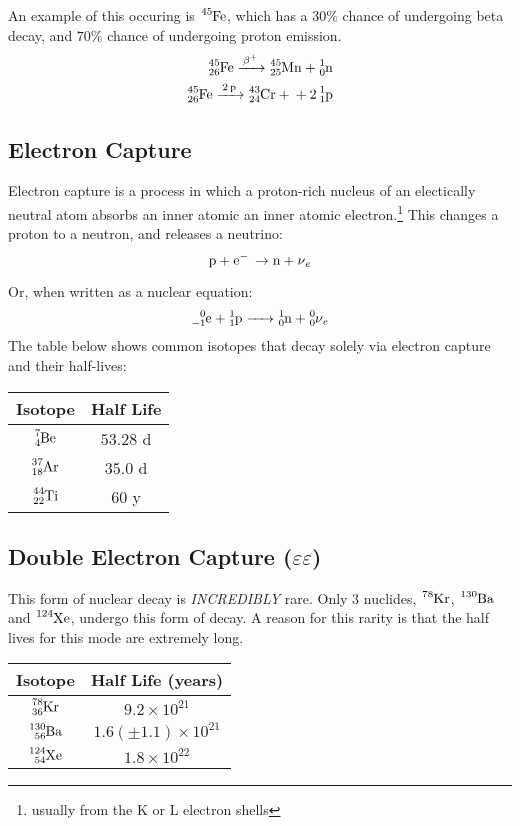 \documentclass{article}
\begin{document}
\begin{multicols*}{2}
    An example of this occuring is $\ce{^{45}Fe}$, which has a $30\%$ chance
    of undergoing beta decay, and $70\%$ chance of undergoing proton emission.
    \begin{equation*}
      \begin{split}
        \ce{^{45}_{26}Fe ->[\beta^{+}] ^{45}_{25}Mn + ^{1}_{0}n} \\
        \ce{^{45}_{26}Fe ->[2p] ^{43}_{24}Cr + + 2 ^{1}_{1}p}
      \end{split}
    \end{equation*}

    \subsection{Electron Capture}
    Electron capture is a process in which a proton-rich nucleus of an electically
    neutral atom absorbs an inner atomic an inner atomic electron.\footnote{usually from the K or L electron shells}
    This changes a proton to a neutron, and releases a neutrino:
    \[
      \ce{p + e- \to n + \nu_e}
    \]

    Or, when written as a nuclear equation:
    \[
      \ce{^{0}_{-1}e + ^{1}_{1}p -> ^{1}_{0}n + ^{0}_{0}\nu_{e}}
    \]
    The table below shows common isotopes that decay solely via electron capture
    and their half-lives: \\

    \begin{tabular}{|c|c|}
      \hline
      \textbf{Isotope} & \textbf{Half Life} \\
      \hline
      $\ce{^{7}_{4}Be}$ & $53.28$ d \\
      $\ce{^{37}_{18}Ar}$ & $35.0$ d \\
      $\ce{^{44}_{22}Ti}$ & $60$ y \\
      \hline
    \end{tabular}

    \subsection{Double Electron Capture ($\varepsilon\varepsilon$)}
    This form of nuclear decay is \textit{INCREDIBLY} rare. Only 3 nuclides,
    $\ce{^{78}Kr}$, $\ce{^{130}Ba}$ and $\ce{^{124}Xe}$, undergo this form of decay.
    A reason for this rarity is that the half lives for this mode are extremely
    long.\\

    \begin{tabular}{|c|c|}
      \hline
      \textbf{Isotope} & \textbf{Half Life (years)} \\
      \hline
      $\ce{^{78}_{36}Kr}$ & $9.2 \times 10^{21}$ \\
      $\ce{^{130}_{56}Ba}$ & $1.6(\pm{1.1})\times 10^{21}$ \\
      $\ce{^{124}_{54}Xe}$ & $1.8 \times 10^{22}$ \\
      \hline
    \end{tabular}


\end{multicols*}
\end{document}
